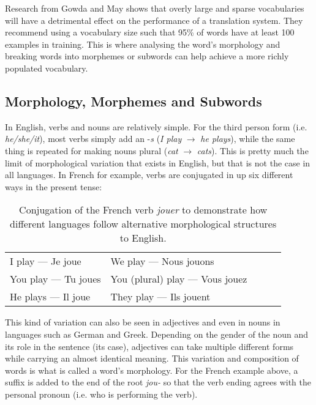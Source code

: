 \documentclass[11pt]{article}
\begin{document}
\bigskip

Research from Gowda and May \citeyearpar{gowda-may-2020-finding} shows that overly large and sparse vocabularies will have a detrimental effect on the performance of a translation system. They recommend using a vocabulary size such that 95\% of words have at least 100 examples in training. This is where analysing the word's morphology and breaking words into morphemes or subwords can help achieve a more richly populated vocabulary.

\subsection{Morphology, Morphemes and Subwords}

In English, verbs and nouns are relatively simple. For the third person form (i.e. \textit{he/she/it}), most verbs simply add an -\textit{s} (\textit{I play} $\to$ \textit{he plays}), while the same thing is repeated for making nouns plural (\textit{cat} $\to$ \textit{cats}). This is pretty much the limit of morphological variation that exists in English, but that is not the case in all languages. In French for example, verbs are conjugated in up six different ways in the present tense:

\begin{table}[h]
\centering
\begin{tabular}{lllll}
I play — Je joue    & We play — Nous jouons           \\
You play — Tu joues & You (plural) play — Vous jouez  \\
He plays — Il joue  & They play — Ils jouent          \\
\end{tabular}
\caption{Conjugation of the French verb \textit{jouer} to demonstrate how different languages follow alternative morphological structures to English.}
\label{table:conjugation}

\end{table}

\bigskip

This kind of variation can also be seen in adjectives and even in nouns in languages such as German and Greek. Depending on the gender of the noun and its role in the sentence (its case), adjectives can take multiple different forms while carrying an almost identical meaning. This variation and composition of words is what is called a word's morphology. For the French example above, a suffix is added to the end of the root \textit{jou-} so that the verb ending agrees with the personal pronoun (i.e. who is performing the verb). 
\end{document}
